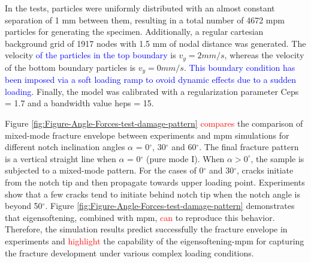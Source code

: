 \documentclass[preprint,12pt,a4paper]{elsarticle}
\begin{document}
In the tests, particles were uniformly distributed with an almost
constant separation of 1 mm between them, resulting in a total number of 4672
\acrshort{mpm} particles for generating the specimen. Additionally, a
regular cartesian background grid of 1917 nodes with 1.5 mm of nodal distance
was generated. The velocity \textcolor{blue}{of the particles in the top boundary} is $v_y = 2 mm/s$, 
whereas the velocity of the bottom boundary particles is $v_y = 0 mm/s$. \textcolor{blue}{This boundary condition has been imposed via a soft loading ramp to ovoid dynamic effects due to a sudden loading}.
Finally, the model was calibrated with a regularization parameter \gls{Ceps} = 1.7 and a
bandwidth value \gls{heps} = 15.

Figure \ref{fig:Figure-Angle-Forces-test-damage-pattern} \textcolor{red}{compares} the
comparison of mixed-mode fracture envelope between experiments and
\acrshort{mpm} simulations for different notch inclination angles
$\alpha$ = 0$^{\circ}$, 30$^{\circ}$ and 60$^{\circ}$. The final
fracture pattern is a vertical straight line when $\alpha$ = 0$^{\circ}$  (pure mode I). 
When $\alpha > 0^{\circ}$, the sample is
subjected to a mixed-mode pattern. For the cases of 0$^{\circ}$ and 30$^{\circ}$, cracks
initiate from the notch tip and then propagate towards upper loading
point. Experiments show that a few cracks tend to initiate behind
notch tip when the notch angle is beyond 50$^{\circ}$. Figure
\ref{fig:Figure-Angle-Forces-test-damage-pattern} demonstrates that
eigensoftening, combined with \acrshort{mpm}, \textcolor{red}{can} to reproduce this
behavior. Therefore, the simulation results predict successfully the
fracture envelope in experiments and \textcolor{red}{highlight} the capability of
the eigensoftening-\acrshort{mpm} for capturing the fracture development under various complex loading conditions. 
\end{document}
